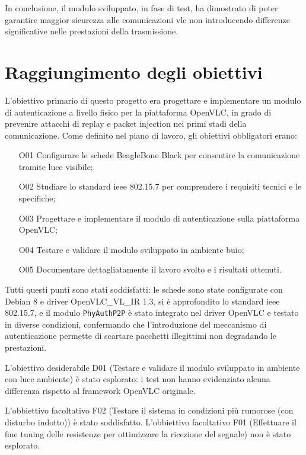 In conclusione, il modulo sviluppato, in fase di test, ha dimostrato di poter garantire maggior sicurezza alle comunicazioni \gls{vlc} non introducendo differenze significative nelle prestazioni della trasmissione.\\

\section{Raggiungimento degli obiettivi}
L'obiettivo primario di questo progetto era progettare e implementare un modulo di autenticazione a livello fisico per la piattaforma OpenVLC, in grado di prevenire attacchi di replay e packet injection nei primi stadi della comunicazione. Come definito nel piano di lavoro, gli obiettivi obbligatori erano:
\begin{itemize}
  \item[O01] Configurare le schede BeagleBone Black per consentire la comunicazione tramite luce visibile;
  \item[O02] Studiare lo standard \gls{ieee} 802.15.7 per comprendere i requisiti tecnici e le specifiche;
  \item[O03] Progettare e implementare il modulo di autenticazione sulla piattaforma OpenVLC;
  \item[O04] Testare e validare il modulo sviluppato in ambiente buio;
  \item[O05] Documentare dettagliatamente il lavoro svolto e i risultati ottenuti.
\end{itemize}
Tutti questi punti sono stati soddisfatti: le schede sono state configurate con Debian 8 e driver OpenVLC\_VL\_IR 1.3, si è approfondito lo standard \gls{ieee} 802.15.7, e il modulo \texttt{PhyAuthP2P} è stato integrato nel driver OpenVLC e testato in diverse condizioni, confermando che l'introduzione del meccanismo di autenticazione permette di scartare pacchetti illegittimi non degradando le prestazioni.

L'obiettivo desiderabile D01 (Testare e validare il modulo sviluppato in ambiente con luce ambiente) è stato esplorato: i test non hanno evidenziato alcuna differenza rispetto al framework OpenVLC originale.

L'obbiettivo facoltativo F02 (Testare il sistema in condizioni più rumorose (con disturbo indotto)) è stato soddisfatto.
L'obbiettivo facoltativo F01 (Effettuare il fine tuning delle resistenze per ottimizzare la ricezione del segnale) non è stato esplorato.

